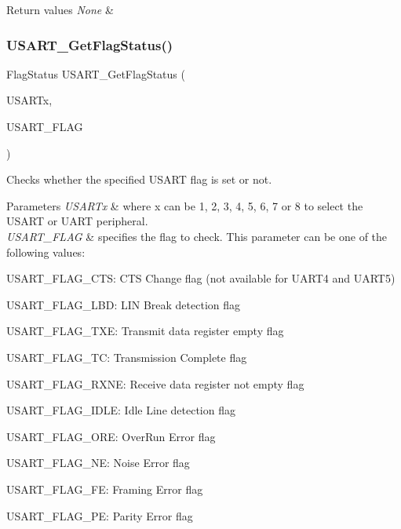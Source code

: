 \begin{DoxyRetVals}{Return values}
{\em None} & \\
\hline
\end{DoxyRetVals}
\mbox{\label{group___u_s_a_r_t___group9_ga144630722defc9e312f0ad280b68e9da}} 
\subsubsection{\texorpdfstring{U\+S\+A\+R\+T\+\_\+\+Get\+Flag\+Status()}{USART\_GetFlagStatus()}}
{\footnotesize\ttfamily Flag\+Status U\+S\+A\+R\+T\+\_\+\+Get\+Flag\+Status (\begin{DoxyParamCaption}\item[{U\+S\+A\+R\+T\+\_\+\+Type\+Def $\ast$}]{U\+S\+A\+R\+Tx,  }\item[{uint16\+\_\+t}]{U\+S\+A\+R\+T\+\_\+\+F\+L\+AG }\end{DoxyParamCaption})}



Checks whether the specified U\+S\+A\+RT flag is set or not. 


\begin{DoxyParams}{Parameters}
{\em U\+S\+A\+R\+Tx} & where x can be 1, 2, 3, 4, 5, 6, 7 or 8 to select the U\+S\+A\+RT or U\+A\+RT peripheral. \\
\hline
{\em U\+S\+A\+R\+T\+\_\+\+F\+L\+AG} & specifies the flag to check. This parameter can be one of the following values\+: \begin{DoxyItemize}
\item U\+S\+A\+R\+T\+\_\+\+F\+L\+A\+G\+\_\+\+C\+TS\+: C\+TS Change flag (not available for U\+A\+R\+T4 and U\+A\+R\+T5) \item U\+S\+A\+R\+T\+\_\+\+F\+L\+A\+G\+\_\+\+L\+BD\+: L\+IN Break detection flag \item U\+S\+A\+R\+T\+\_\+\+F\+L\+A\+G\+\_\+\+T\+XE\+: Transmit data register empty flag \item U\+S\+A\+R\+T\+\_\+\+F\+L\+A\+G\+\_\+\+TC\+: Transmission Complete flag \item U\+S\+A\+R\+T\+\_\+\+F\+L\+A\+G\+\_\+\+R\+X\+NE\+: Receive data register not empty flag \item U\+S\+A\+R\+T\+\_\+\+F\+L\+A\+G\+\_\+\+I\+D\+LE\+: Idle Line detection flag \item U\+S\+A\+R\+T\+\_\+\+F\+L\+A\+G\+\_\+\+O\+RE\+: Over\+Run Error flag \item U\+S\+A\+R\+T\+\_\+\+F\+L\+A\+G\+\_\+\+NE\+: Noise Error flag \item U\+S\+A\+R\+T\+\_\+\+F\+L\+A\+G\+\_\+\+FE\+: Framing Error flag \item U\+S\+A\+R\+T\+\_\+\+F\+L\+A\+G\+\_\+\+PE\+: Parity Error flag \end{DoxyItemize}
\\
\hline
\end{DoxyParams}

